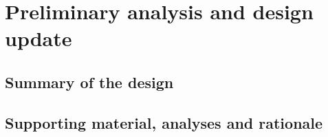 \section{Preliminary analysis and design update}

\subsection{Summary of the design}
\subsection{Supporting material, analyses and rationale}


